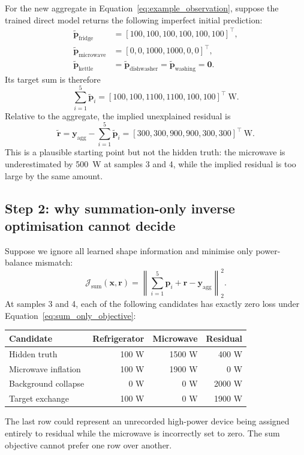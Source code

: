 \documentclass[11pt]{article}
\newcommand{\vect}[1]{\mathbf{#1}}
\begin{document}
For the new aggregate in Equation~\eqref{eq:example_observation}, suppose the trained direct model returns the following imperfect initial prediction:
\begin{align}
    \tilde{\vect{p}}_{\mathrm{fridge}}&=[100,100,100,100,100,100]^{\top},\\
    \tilde{\vect{p}}_{\mathrm{microwave}}&=[0,0,1000,1000,0,0]^{\top},\\
    \tilde{\vect{p}}_{\mathrm{kettle}}&=
    \tilde{\vect{p}}_{\mathrm{dishwasher}}=
    \tilde{\vect{p}}_{\mathrm{washing}}=\vect{0}.
    \label{eq:direct_initialisation}
\end{align}
Its target sum is therefore
\begin{equation}
    \sum_{i=1}^{5}\tilde{\vect{p}}_i
    =[100,100,1100,1100,100,100]^{\top}\ \mathrm{W}.
\end{equation}
Relative to the aggregate, the implied unexplained residual is
\begin{equation}
    \tilde{\vect{r}}=
    \vect{y}_{\mathrm{agg}}-
    \sum_{i=1}^{5}\tilde{\vect{p}}_i
    =[300,300,900,900,300,300]^{\top}\ \mathrm{W}.
    \label{eq:initial_residual}
\end{equation}
This is a plausible starting point but not the hidden truth: the microwave is underestimated by 500~W at samples 3 and 4, while the implied residual is too large by the same amount.

\subsection{Step 2: why summation-only inverse optimisation cannot decide}

Suppose we ignore all learned shape information and minimise only power-balance mismatch:
\begin{equation}
    \mathcal{J}_{\mathrm{sum}}(\vect{x},\vect{r})=
    \left\|
    \sum_{i=1}^{5}\vect{p}_i+\vect{r}-
    \vect{y}_{\mathrm{agg}}
    \right\|_2^2.
    \label{eq:sum_only_objective}
\end{equation}
At samples 3 and 4, each of the following candidates has exactly zero loss under Equation~\eqref{eq:sum_only_objective}:
\begin{center}
\begin{tabular}{lrrr}
\toprule
Candidate & Refrigerator & Microwave & Residual \\
\midrule
Hidden truth & 100 W & 1500 W & 400 W \\
Microwave inflation & 100 W & 1900 W & 0 W \\
Background collapse & 0 W & 0 W & 2000 W \\
Target exchange & 100 W & 0 W & 1900 W \\
\bottomrule
\end{tabular}
\end{center}
The last row could represent an unrecorded high-power device being assigned entirely to residual while the microwave is incorrectly set to zero. The sum objective cannot prefer one row over another.
\end{document}
